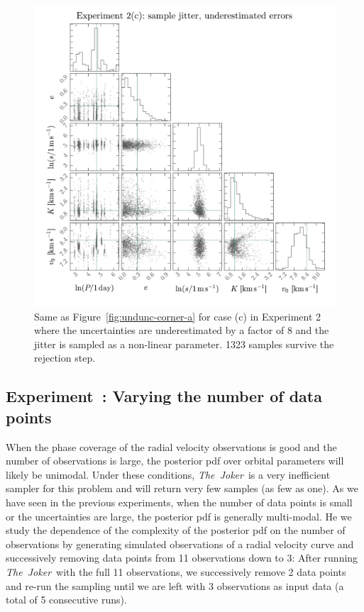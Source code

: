 \documentclass[manuscript, letterpaper]{aastex6}
\newcommand{\project}[1]{\textsl{#1}}
\newcommand{\samplername}{\project{The~Joker}}
\newcommand{\figname}{Figure}
\newcounter{expcounter}
\begin{document}
\begin{figure}[p]
\begin{center}
\includegraphics[width=\textwidth]{figures/undunc-corner-c.pdf}
\end{center}
\caption{%
Same as \figname~\ref{fig:undunc-corner-a} for case (c) in Experiment 2 where the
uncertainties are underestimated by a factor of 8 and the jitter is sampled as
a non-linear parameter.
1323 samples survive the rejection step.
\label{fig:undunc-corner-c}}
\end{figure}

\subsection{Experiment~: Varying the number of data points}
\label{sec:numpts}

When the phase coverage of the radial velocity observations is good and the
number of observations is large, the posterior pdf over orbital parameters will
likely be unimodal.
Under these conditions, \samplername\ is a very inefficient sampler for this
problem and will return very few samples (as few as one).
As we have seen in the previous experiments, when the number of data points is
small or the uncertainties are large, the posterior pdf is generally
multi-modal.
He we study the dependence of the complexity of the posterior pdf on the number
of observations by generating simulated observations of a radial velocity curve
and successively removing data points from 11 observations down to 3:
After running \samplername\ with the full 11 observations, we successively
remove 2 data points and re-run the sampling until we are left with 3
observations as input data (a total of 5 consecutive runs).
\end{document}
